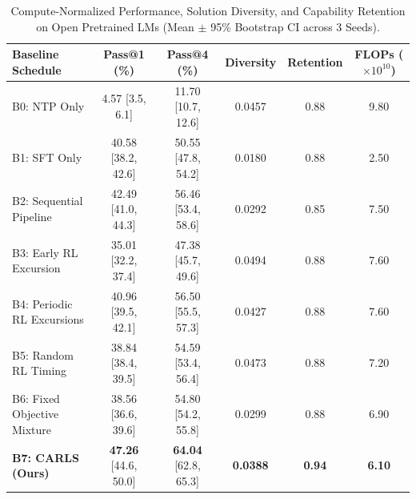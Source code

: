 \begin{table}[h]
\centering
\caption{Compute-Normalized Performance, Solution Diversity, and Capability Retention on Open Pretrained LMs (Mean $\pm$ 95\% Bootstrap CI across 3 Seeds).}
\label{tab:baselines}
\begin{tabular}{lccccc}
\hline
\textbf{Baseline Schedule} & \textbf{Pass@1 (\%)} & \textbf{Pass@4 (\%)} & \textbf{Diversity} & \textbf{Retention} & \textbf{FLOPs ($\times 10^{10}$)} \\
\hline
B0: NTP Only & 4.57 [3.5, 6.1] & 11.70 [10.7, 12.6] & 0.0457 & 0.88 & 9.80 \\
B1: SFT Only & 40.58 [38.2, 42.6] & 50.55 [47.8, 54.2] & 0.0180 & 0.88 & 2.50 \\
B2: Sequential Pipeline & 42.49 [41.0, 44.3] & 56.46 [53.4, 58.6] & 0.0292 & 0.85 & 7.50 \\
B3: Early RL Excursion & 35.01 [32.2, 37.4] & 47.38 [45.7, 49.6] & 0.0494 & 0.88 & 7.60 \\
B4: Periodic RL Excursions & 40.96 [39.5, 42.1] & 56.50 [55.5, 57.3] & 0.0427 & 0.88 & 7.60 \\
B5: Random RL Timing & 38.84 [38.4, 39.5] & 54.59 [53.4, 56.4] & 0.0473 & 0.88 & 7.20 \\
B6: Fixed Objective Mixture & 38.56 [36.6, 39.6] & 54.80 [54.2, 55.8] & 0.0299 & 0.88 & 6.90 \\
\textbf{B7: CARLS (Ours)} & \textbf{47.26} [44.6, 50.0] & \textbf{64.04} [62.8, 65.3] & \textbf{0.0388} & \textbf{0.94} & \textbf{6.10} \\
\hline
\end{tabular}
\end{table}
